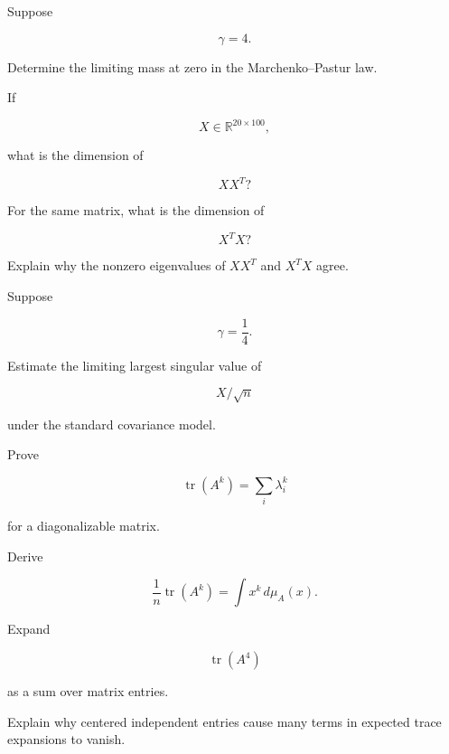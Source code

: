 \begin{exercise}[2]
Suppose

\[
\gamma=4.
\]

Determine the limiting mass at zero in the Marchenko--Pastur law.
\end{exercise}

\begin{exercise}[2]
If

\[
X\in\mathbb{R}^{20\times100},
\]

what is the dimension of

\[
XX^T?
\]
\end{exercise}

\begin{exercise}[2]
For the same matrix, what is the dimension of

\[
X^TX?
\]
\end{exercise}

\begin{exercise}[2]
Explain why the nonzero eigenvalues of \(XX^T\) and \(X^TX\) agree.
\end{exercise}

\begin{exercise}[2]
Suppose

\[
\gamma=\frac14.
\]

Estimate the limiting largest singular value of

\[
X/\sqrt{n}
\]

under the standard covariance model.
\end{exercise}

\begin{exercise}[3]
Prove

\[
\operatorname{tr}(A^k)
=
\sum_i\lambda_i^k
\]

for a diagonalizable matrix.
\end{exercise}

\begin{exercise}[3]
Derive

\[
\frac1n\operatorname{tr}(A^k)
=
\int x^k\,d\mu_A(x).
\]
\end{exercise}

\begin{exercise}[3]
Expand

\[
\operatorname{tr}(A^4)
\]

as a sum over matrix entries.
\end{exercise}

\begin{exercise}[3]
Explain why centered independent entries cause many terms in expected
trace expansions to vanish.
\end{exercise}

